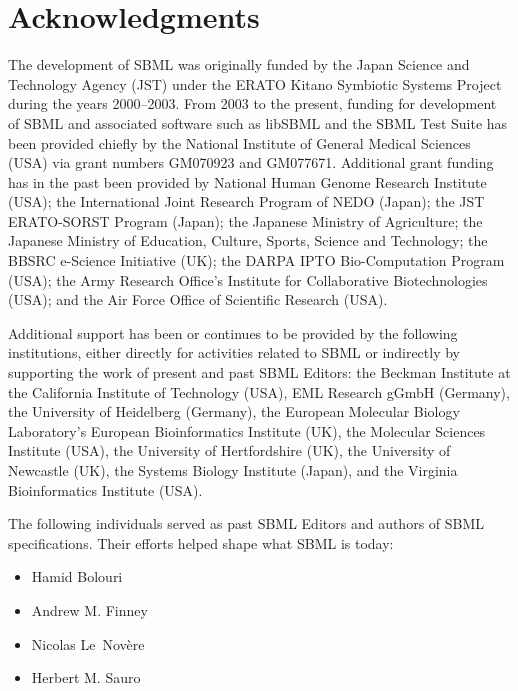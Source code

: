 
\section{Acknowledgments}
\label{sec:acknowledgements}
\label{sec:acknowledgments}

The development of SBML was originally funded by the Japan Science
and Technology Agency (JST) under the ERATO Kitano Symbiotic
Systems Project during the years 2000--2003.  From 2003 to the
present, funding for development of SBML and associated software
such as libSBML and the SBML Test Suite has been provided chiefly
by the National Institute of General Medical Sciences (USA) via
grant numbers GM070923 and GM077671.  Additional grant funding has
in the past been provided by National Human Genome Research
Institute (USA); the International Joint Research Program of NEDO
(Japan); the JST ERATO-SORST Program (Japan); the Japanese
Ministry of Agriculture; the Japanese Ministry of Education,
Culture, Sports, Science and Technology; the BBSRC e-Science
Initiative (UK); the DARPA IPTO Bio-Computation Program (USA); the
Army Research Office's Institute for Collaborative Biotechnologies
(USA); and the Air Force Office of Scientific Research (USA).

Additional support has been or continues to be provided by the
following institutions, either directly for activities related to
SBML or indirectly by supporting the work of present and past SBML
Editors: the Beckman Institute at the California Institute of
Technology (USA), EML Research gGmbH (Germany), the University of
Heidelberg (Germany), the European Molecular Biology Laboratory's
European Bioinformatics Institute (UK), the Molecular Sciences
Institute (USA), the University of Hertfordshire (UK), the
University of Newcastle (UK), the Systems Biology Institute
(Japan), and the Virginia Bioinformatics Institute (USA).

The following individuals served as past SBML Editors and authors
of SBML specifications.  Their efforts helped shape what SBML is
today:
\begin{itemize}\setlength{\parskip}{-0.2ex}

\item Hamid Bolouri
\item Andrew M. Finney
\item Nicolas Le~Nov\`{e}re
\item Herbert M. Sauro

\end{itemize}

